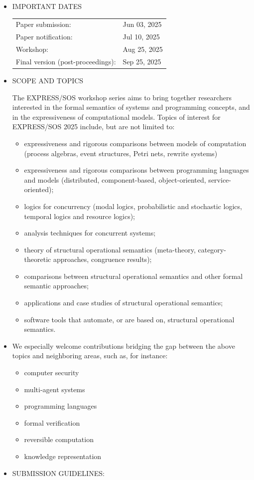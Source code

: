 \documentclass[prodmode,acmtecs]{acmsmall} %
\begin{document}
\begin{itemize}\item  IMPORTANT DATES 
 
\begin{tabulary}{\linewidth}{LL}Paper submission:  & Jun 03, 2025 \\
Paper notification:  & Jul 10, 2025 \\
Workshop:  & Aug 25, 2025 \\
Final version (post-proceedings):  & Sep 25, 2025 \\
\end{tabulary}
 
\item  SCOPE AND TOPICS 
 
  The EXPRESS/SOS workshop series aims to bring together researchers interested in the formal semantics of systems and programming concepts, and in the expressiveness of computational models. Topics of interest for EXPRESS/SOS 2025 include, but are not limited to: 
 
\begin{itemize}\item  expressiveness and rigorous comparisons between models of computation (process algebras, event structures, Petri nets, rewrite systems)
\item  expressiveness and rigorous comparisons between programming languages and models (distributed, component-based, object-oriented, service-oriented);
\item  logics for concurrency (modal logics, probabilistic and stochastic logics, temporal logics and resource logics);
\item  analysis techniques for concurrent systems;
\item  theory of structural operational semantics (meta-theory, category-theoretic approaches, congruence results);
\item  comparisons between structural operational semantics and other formal semantic approaches;
\item  applications and case studies of structural operational semantics;
\item  software tools that automate, or are based on, structural operational semantics.
\end{itemize} 
\item  We especially welcome contributions bridging the gap between the above topics and neighboring areas, such as, for instance: 
 
\begin{itemize}\item  computer security 
\item  multi-agent systems
\item  programming languages
\item  formal verification
\item  reversible computation
\item  knowledge representation
\end{itemize} 
\item  SUBMISSION GUIDELINES: 
 

\end{itemize}
\end{document}
